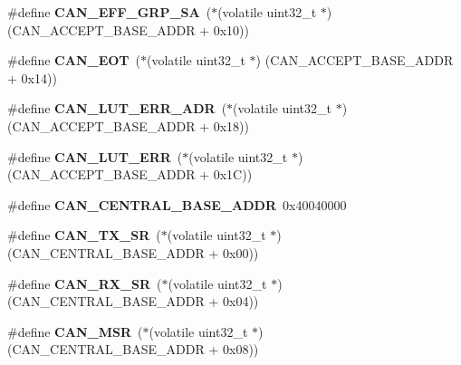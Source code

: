 \begin{DoxyCompactItemize}
\#define {\bfseries C\+A\+N\+\_\+\+E\+F\+F\+\_\+\+G\+R\+P\+\_\+\+SA}~($\ast$(volatile uint32\+\_\+t $\ast$) (C\+A\+N\+\_\+\+A\+C\+C\+E\+P\+T\+\_\+\+B\+A\+S\+E\+\_\+\+A\+D\+DR + 0x10))
\item 
\mbox{\label{group__lpc24xx__regs_ga25a760484deef63d7d5ae093304ee210}} 
\#define {\bfseries C\+A\+N\+\_\+\+E\+OT}~($\ast$(volatile uint32\+\_\+t $\ast$) (C\+A\+N\+\_\+\+A\+C\+C\+E\+P\+T\+\_\+\+B\+A\+S\+E\+\_\+\+A\+D\+DR + 0x14))
\item 
\mbox{\label{group__lpc24xx__regs_ga8fa7a368ce77533d6d1371aa2d381efc}} 
\#define {\bfseries C\+A\+N\+\_\+\+L\+U\+T\+\_\+\+E\+R\+R\+\_\+\+A\+DR}~($\ast$(volatile uint32\+\_\+t $\ast$) (C\+A\+N\+\_\+\+A\+C\+C\+E\+P\+T\+\_\+\+B\+A\+S\+E\+\_\+\+A\+D\+DR + 0x18))
\item 
\mbox{\label{group__lpc24xx__regs_ga095d08b305b7b51a9bf625c9cb78dc11}} 
\#define {\bfseries C\+A\+N\+\_\+\+L\+U\+T\+\_\+\+E\+RR}~($\ast$(volatile uint32\+\_\+t $\ast$) (C\+A\+N\+\_\+\+A\+C\+C\+E\+P\+T\+\_\+\+B\+A\+S\+E\+\_\+\+A\+D\+DR + 0x1\+C))
\item 
\mbox{\label{group__lpc24xx__regs_ga90d78085df864aa837ec05157b688191}} 
\#define {\bfseries C\+A\+N\+\_\+\+C\+E\+N\+T\+R\+A\+L\+\_\+\+B\+A\+S\+E\+\_\+\+A\+D\+DR}~0x40040000
\item 
\mbox{\label{group__lpc24xx__regs_gaabdb40de57b21a5feca2ce0efbdecb13}} 
\#define {\bfseries C\+A\+N\+\_\+\+T\+X\+\_\+\+SR}~($\ast$(volatile uint32\+\_\+t $\ast$) (C\+A\+N\+\_\+\+C\+E\+N\+T\+R\+A\+L\+\_\+\+B\+A\+S\+E\+\_\+\+A\+D\+DR + 0x00))
\item 
\mbox{\label{group__lpc24xx__regs_gad04297df7b39b8b19b5498a46fd156ed}} 
\#define {\bfseries C\+A\+N\+\_\+\+R\+X\+\_\+\+SR}~($\ast$(volatile uint32\+\_\+t $\ast$) (C\+A\+N\+\_\+\+C\+E\+N\+T\+R\+A\+L\+\_\+\+B\+A\+S\+E\+\_\+\+A\+D\+DR + 0x04))
\item 
\mbox{\label{group__lpc24xx__regs_ga716170f2e3d40418e1fe844a808db138}} 
\#define {\bfseries C\+A\+N\+\_\+\+M\+SR}~($\ast$(volatile uint32\+\_\+t $\ast$) (C\+A\+N\+\_\+\+C\+E\+N\+T\+R\+A\+L\+\_\+\+B\+A\+S\+E\+\_\+\+A\+D\+DR + 0x08))

\end{DoxyCompactItemize}
